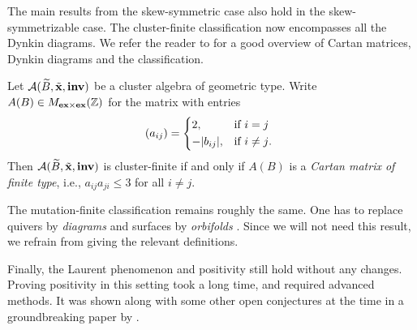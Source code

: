 The main results from the skew-symmetric case also hold in the skew-symmetrizable case.
The cluster-finite classification now encompasses all the Dynkin diagrams. We refer the
reader to \cite[Chapter 5]{FominWilliams2021IntroductionCA_4-5} for a good overview of
Cartan matrices, Dynkin diagrams and the classification.
\begin{theorem}\label{thm:cluster_finite_general_case}

	Let $\mathcal{A}(\widetilde{B}, \tilde{\mathbf{x}}, \mathbf{inv})$ be a cluster algebra of geometric type. Write $A(B) \in
		M_{\mathbf{ex} \times \mathbf{ex}}(\mathbb{Z})$ for the matrix with entries
	\begin{equation*}
		(a_{ij}) = \begin{dcases*}
			2,         & if $i = j$     \\
			-|b_{ij}|, & if $i \neq j$.
		\end{dcases*}
	\end{equation*}
	Then $\mathcal{A}(\widetilde{B}, \tilde{\mathbf{x}}, \mathbf{inv})$ is cluster-finite if and only if $A(B)$ is a \emph{Cartan
		matrix of finite type}, i.e., $a_{ij}a_{ji} \leq 3$ for all $i
		\neq j$.
\end{theorem}

The mutation-finite classification remains roughly the same. One has to replace quivers
by \emph{diagrams} and surfaces by \emph{orbifolds}
\parencite{FeliksonPavel2023cluster}. Since we will not need this result, we refrain from
giving the relevant definitions.

Finally, the Laurent phenomenon and positivity still hold without any changes. Proving
positivity in this setting took a long time, and required advanced methods. It was
shown along with some other open conjectures at the time in a groundbreaking paper by
\textcite{GrossHackingKeelKontsevich2018CanonicalBCA}.

